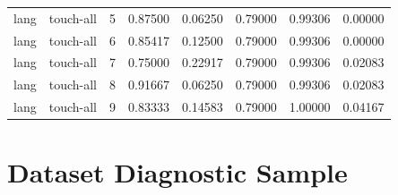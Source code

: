 \documentclass{article}
\begin{document}
\begin{center}
\begin{longtable}{llllllll}
lang & touch-all & 5 & 0.87500 & 0.06250 & 0.79000 & 0.99306 & 0.00000 \\
lang & touch-all & 6 & 0.85417 & 0.12500 & 0.79000 & 0.99306 & 0.00000 \\
lang & touch-all & 7 & 0.75000 & 0.22917 & 0.79000 & 0.99306 & 0.02083 \\
lang & touch-all & 8 & 0.91667 & 0.06250 & 0.79000 & 0.99306 & 0.02083 \\
lang & touch-all & 9 & 0.83333 & 0.14583 & 0.79000 & 1.00000 & 0.04167 \\
\bottomrule
\end{longtable}
\renewcommand{\arraystretch}{1.0}
\end{center}

\clearpage
\section{Dataset Diagnostic Sample}
\end{document}
